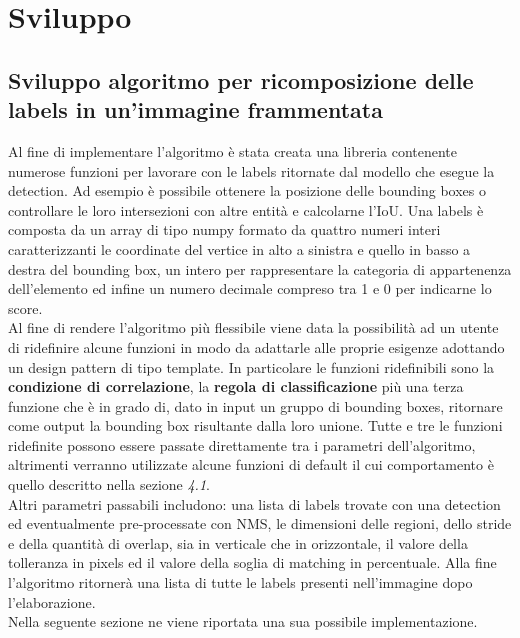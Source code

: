 \section{Sviluppo}
\subsection{Sviluppo algoritmo per ricomposizione delle labels in un'immagine frammentata}
Al fine di implementare l'algoritmo è stata creata una libreria contenente numerose funzioni per lavorare con le labels ritornate dal modello che esegue la detection. Ad esempio è possibile ottenere la posizione delle bounding boxes o controllare le loro intersezioni con altre entità e calcolarne l'IoU. Una labels è composta da un array di tipo numpy formato da quattro numeri interi caratterizzanti le coordinate del vertice in alto a sinistra e quello in basso a destra del bounding box, un intero per rappresentare la categoria di appartenenza dell'elemento ed infine un numero decimale compreso tra 1 e 0 per indicarne lo score.\\
Al fine di rendere l'algoritmo più flessibile viene data la possibilità ad un utente di ridefinire alcune funzioni in modo da adattarle alle proprie esigenze adottando un design pattern di tipo template. In particolare le funzioni ridefinibili sono la \textbf{condizione di correlazione}, la \textbf{regola di classificazione} più una terza funzione che è in grado di, dato in input un gruppo di bounding boxes, ritornare come output la bounding box risultante dalla loro unione. Tutte e tre le funzioni ridefinite possono essere passate direttamente tra i parametri dell'algoritmo, altrimenti verranno utilizzate alcune funzioni di default il cui comportamento è quello descritto nella sezione \textit{4.1}.\\
Altri parametri passabili includono: una lista di labels trovate con una detection ed eventualmente pre-processate con NMS, le dimensioni delle regioni, dello stride e della quantità di overlap, sia in verticale che in orizzontale, il valore della tolleranza in pixels ed il valore della soglia di matching in percentuale.
Alla fine l'algoritmo ritornerà una lista di tutte le labels presenti nell'immagine dopo l'elaborazione.\\ Nella seguente sezione ne viene riportata una sua possibile implementazione.
